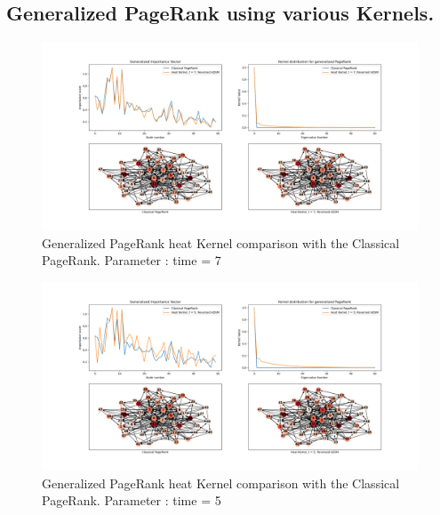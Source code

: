 \documentclass[sn-mathphys]{sn-jnl}%
\theoremstyle{thmstyleone}%
\theoremstyle{thmstyletwo}%
\theoremstyle{thmstylethree}%
\begin{document}
\begin{appendices}

\section{Generalized PageRank using various Kernels.}

\begin{figure}[H]
    \centering
    \centerline{
    \includegraphics[width= 1.25\textwidth]{results_figures/heat_kernel_7.png}
    }
    \caption{Generalized PageRank heat Kernel comparison with the Classical PageRank. Parameter : time = 7}
    \label{fig:heatK9}
\end{figure}

\begin{figure}[H]
    \centering
    \centerline{
    \includegraphics[width= 1.25\textwidth]{results_figures/heat_kernel_5.png}
    }
    \caption{Generalized PageRank heat Kernel comparison with the Classical PageRank. Parameter : time = 5}
    \label{fig:heatK5}
\end{figure}



\end{appendices}
\end{document}
